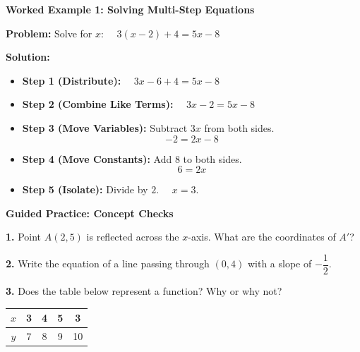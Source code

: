 \documentclass[12pt, letterpaper, fleqn]{article}
\begin{document}
\vspace{3mm}

\begin{tcolorbox}[colback=white, colframe=black!25, boxrule=0.6pt, arc=4mm, left=6mm, right=6mm, top=5mm, bottom=5mm]

\textbf{Worked Example 1: Solving Multi-Step Equations}

\medskip

\textbf{Problem:} Solve for $x$: \ \ $3(x - 2) + 4 = 5x - 8$

\medskip

\textbf{Solution:}
\begin{itemize}
    \item \textbf{Step 1 (Distribute):} \ \ $3x - 6 + 4 = 5x - 8$
    \item \textbf{Step 2 (Combine Like Terms):} \ \ $3x - 2 = 5x - 8$
    \item \textbf{Step 3 (Move Variables):} Subtract $3x$ from both sides.
    \[ -2 = 2x - 8 \]
    \item \textbf{Step 4 (Move Constants):} Add $8$ to both sides.
    \[ 6 = 2x \]
    \item \textbf{Step 5 (Isolate):} Divide by $2$. \ \ $x = 3$.
\end{itemize}

\end{tcolorbox}

\vspace{4mm}

\begin{tcolorbox}[colback=white!15, colframe=black, boxrule=1.5pt, arc=4mm, left=6mm, right=6mm, top=5mm, bottom=5mm]

\textbf{Guided Practice: Concept Checks}

\medskip

\noindent
\textbf{1.} Point $A(2, 5)$ is reflected across the $x$-axis. What are the coordinates of $A'$?
\vspace{1cm}

\noindent
\textbf{2.} Write the equation of a line passing through $(0, 4)$ with a slope of $-\dfrac{1}{2}$.
\vspace{1.5cm}

\noindent
\textbf{3.} Does the table below represent a function? Why or why not?

\begin{tabular}{|c|c|c|c|c|}
\hline
$x$ & 3 & 4 & 5 & 3 \\
\hline
$y$ & 7 & 8 & 9 & 10 \\
\hline
\end{tabular}

\vspace{1.5cm}

\end{tcolorbox}
\end{document}
